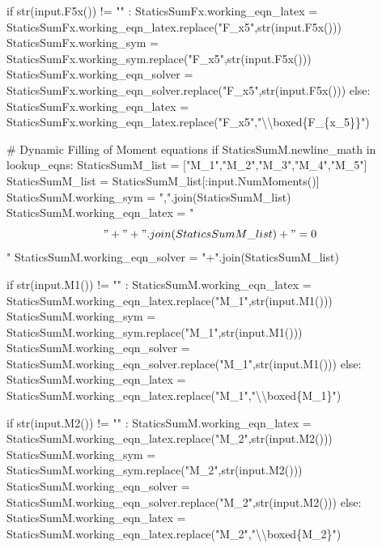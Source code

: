\documentclass[
  letterpaper,
  DIV=11,
  numbers=noendperiod]{scrreprt}
\newenvironment{Shaded}{\begin{snugshade}}{\end{snugshade}}
\newcommand{\NormalTok}[1]{\textcolor[rgb]{0.00,0.23,0.31}{#1}}
\begin{document}
\begin{Shaded}
\begin{Highlighting}[]
\NormalTok{            if str(input.F5x()) != "" : }
\NormalTok{                StaticsSumFx.working\_eqn\_latex = StaticsSumFx.working\_eqn\_latex.replace("F\_x5",str(input.F5x()))}
\NormalTok{                StaticsSumFx.working\_sym = StaticsSumFx.working\_sym.replace("F\_x5",str(input.F5x()))}
\NormalTok{                StaticsSumFx.working\_eqn\_solver = StaticsSumFx.working\_eqn\_solver.replace("F\_x5",str(input.F5x()))}
\NormalTok{            else:}
\NormalTok{                StaticsSumFx.working\_eqn\_latex = StaticsSumFx.working\_eqn\_latex.replace("F\_x5","\textbackslash{}\textbackslash{}boxed\{F\_\{x\_5\}\}")}
                
                
\NormalTok{        \# Dynamic Filling of Moment equations }
\NormalTok{        if StaticsSumM.newline\_math in lookup\_eqns:}
\NormalTok{            StaticsSumM\_list = ["M\_1","M\_2","M\_3","M\_4","M\_5"]}
\NormalTok{            StaticsSumM\_list = StaticsSumM\_list[:input.NumMoments()]}
\NormalTok{            StaticsSumM.working\_sym = ",".join(StaticsSumM\_list)}
\NormalTok{            StaticsSumM.working\_eqn\_latex = "$$" + "+".join(StaticsSumM\_list) + "=0$$"}
\NormalTok{            StaticsSumM.working\_eqn\_solver = "+".join(StaticsSumM\_list)}
            
\NormalTok{            if str(input.M1()) != "" : }
\NormalTok{                StaticsSumM.working\_eqn\_latex = StaticsSumM.working\_eqn\_latex.replace("M\_1",str(input.M1()))}
\NormalTok{                StaticsSumM.working\_sym = StaticsSumM.working\_sym.replace("M\_1",str(input.M1()))}
\NormalTok{                StaticsSumM.working\_eqn\_solver = StaticsSumM.working\_eqn\_solver.replace("M\_1",str(input.M1()))}
\NormalTok{            else:}
\NormalTok{                StaticsSumM.working\_eqn\_latex = StaticsSumM.working\_eqn\_latex.replace("M\_1","\textbackslash{}\textbackslash{}boxed\{M\_1\}")}
        
\NormalTok{            if str(input.M2()) != "" : }
\NormalTok{                StaticsSumM.working\_eqn\_latex = StaticsSumM.working\_eqn\_latex.replace("M\_2",str(input.M2()))}
\NormalTok{                StaticsSumM.working\_sym = StaticsSumM.working\_sym.replace("M\_2",str(input.M2()))}
\NormalTok{                StaticsSumM.working\_eqn\_solver = StaticsSumM.working\_eqn\_solver.replace("M\_2",str(input.M2()))}
\NormalTok{            else:}
\NormalTok{                StaticsSumM.working\_eqn\_latex = StaticsSumM.working\_eqn\_latex.replace("M\_2","\textbackslash{}\textbackslash{}boxed\{M\_2\}")}
        

\end{Highlighting}
\end{Shaded}
\end{document}
